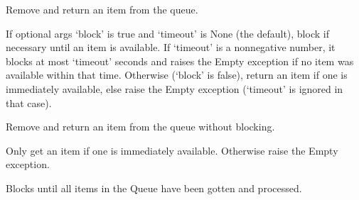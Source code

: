 \documentclass[letterpaper,10pt,english]{sphinxmanual}
\begin{document}
\begin{fulllineitems}
\begin{fulllineitems}
\end{fulllineitems}


\begin{fulllineitems}
\label{\detokenize{modules/src.model_training.trainer:src.model_training.trainer.Queue.get}}
\pysigstartsignatures
\pysiglinewithargsret
{}
{\sphinxparamcomma {}}
{}
\pysigstopsignatures
\sphinxAtStartPar
Remove and return an item from the queue.

\sphinxAtStartPar
If optional args ‘block’ is true and ‘timeout’ is None (the default),
block if necessary until an item is available. If ‘timeout’ is
a non\sphinxhyphen{}negative number, it blocks at most ‘timeout’ seconds and raises
the Empty exception if no item was available within that time.
Otherwise (‘block’ is false), return an item if one is immediately
available, else raise the Empty exception (‘timeout’ is ignored
in that case).

\end{fulllineitems}


\begin{fulllineitems}
\label{\detokenize{modules/src.model_training.trainer:src.model_training.trainer.Queue.get_nowait}}
\pysigstartsignatures
\pysiglinewithargsret
{}
{}
{}
\pysigstopsignatures
\sphinxAtStartPar
Remove and return an item from the queue without blocking.

\sphinxAtStartPar
Only get an item if one is immediately available. Otherwise
raise the Empty exception.

\end{fulllineitems}


\begin{fulllineitems}
\label{\detokenize{modules/src.model_training.trainer:src.model_training.trainer.Queue.join}}
\pysigstartsignatures
\pysiglinewithargsret
{}
{}
{}
\pysigstopsignatures
\sphinxAtStartPar
Blocks until all items in the Queue have been gotten and processed.


\end{fulllineitems}
\end{fulllineitems}
\end{document}
